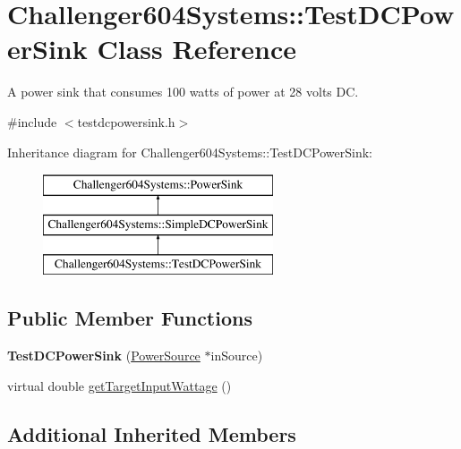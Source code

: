 \hypertarget{class_challenger604_systems_1_1_test_d_c_power_sink}{\section{Challenger604\-Systems\-:\-:Test\-D\-C\-Power\-Sink Class Reference}
\label{class_challenger604_systems_1_1_test_d_c_power_sink}
}


A power sink that consumes 100 watts of power at 28 volts D\-C.  




{\ttfamily \#include $<$testdcpowersink.\-h$>$}

Inheritance diagram for Challenger604\-Systems\-:\-:Test\-D\-C\-Power\-Sink\-:\begin{figure}[H]
\begin{center}
\leavevmode
\includegraphics[height=3.000000cm]{class_challenger604_systems_1_1_test_d_c_power_sink}
\end{center}
\end{figure}
\subsection*{Public Member Functions}
\begin{DoxyCompactItemize}
\item 
\hypertarget{class_challenger604_systems_1_1_test_d_c_power_sink_a7a6b1bb8b24bf52bf194900d1cded416}{{\bfseries Test\-D\-C\-Power\-Sink} (\hyperlink{class_challenger604_systems_1_1_power_source}{Power\-Source} $\ast$in\-Source)}\label{class_challenger604_systems_1_1_test_d_c_power_sink_a7a6b1bb8b24bf52bf194900d1cded416}

\item 
virtual double \hyperlink{class_challenger604_systems_1_1_test_d_c_power_sink_a49ae61c3b70aa9d1be22fb3ac564a053}{get\-Target\-Input\-Wattage} ()
\end{DoxyCompactItemize}
\subsection*{Additional Inherited Members}


